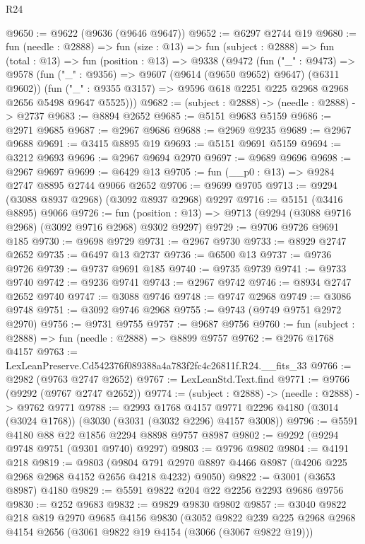 \begin{lexlean}{R24}
\begin{coremodule}
@9650 := @9622 (@9636 (@9646 @9647))
@9652 := @6297 @2744 @19
@9680 := fun (needle : @2888) =>
  fun (size : @13) =>
  fun (subject : @2888) =>
  fun (total : @13) =>
  fun (position : @13) =>
  @9338
    (@9472
      (fun ("_" : @9473) =>
      @9578
        (fun ("_" : @9356) => @9607 (@9614 (@9650 @9652) @9647) (@6311 @9602))
        (fun ("_" : @9355 @3157) => @9596 @618 @2251 @225 @2968 @2968 @2656 @5498 @9647 @5525)))
@9682 := (subject : @2888) -> (needle : @2888) -> @2737
@9683 := @8894 @2652
@9685 := @5151 @9683 @5159
@9686 := @2971 @9685
@9687 := @2967 @9686
@9688 := @2969 @9235
@9689 := @2967 @9688
@9691 := @3415 @8895 @19
@9693 := @5151 @9691 @5159
@9694 := @3212 @9693
@9696 := @2967 @9694 @2970
@9697 := @9689 @9696
@9698 := @2967 @9697
@9699 := @6429 @13
@9705 := fun (__p0 : @13) => @9284 @2747 @8895 @2744 @9066 @2652
@9706 := @9699 @9705
@9713 := @9294 (@3088 @8937 @2968) (@3092 @8937 @2968) @9297
@9716 := @5151 (@3416 @8895) @9066
@9726 := fun (position : @13) => @9713 (@9294 (@3088 @9716 @2968) (@3092 @9716 @2968) @9302 @9297)
@9729 := @9706 @9726 @9691 @185
@9730 := @9698 @9729
@9731 := @2967 @9730
@9733 := @8929 @2747 @2652
@9735 := @6497 @13 @2737
@9736 := @6500 @13
@9737 := @9736 @9726
@9739 := @9737 @9691 @185
@9740 := @9735 @9739
@9741 := @9733 @9740
@9742 := @9236 @9741
@9743 := @2967 @9742
@9746 := @8934 @2747 @2652 @9740
@9747 := @3088 @9746
@9748 := @9747 @2968
@9749 := @3086 @9748
@9751 := @3092 @9746 @2968
@9755 := @9743 (@9749 @9751 @2972 @2970)
@9756 := @9731 @9755
@9757 := @9687 @9756
@9760 := fun (subject : @2888) => fun (needle : @2888) => @8899 @9757
@9762 := @2976 @1768 @4157
@9763 := LexLeanPreserve.Cd542376f089388a4a783f2fc4c26811f.R24.__fits_33
@9766 := @2982 (@9763 @2747 @2652)
@9767 := LexLeanStd.Text.find
@9771 := @9766 (@9292 (@9767 @2747 @2652))
@9774 := (subject : @2888) -> (needle : @2888) -> @9762 @9771
@9788 := @2993
    @1768
    @4157
    @9771
    @2296
    @4180
    (@3014 (@3024 @1768))
    (@3030 (@3031 (@3032 @2296) @4157 @3008))
@9796 := @5591 @4180 @88 @22 @1856 @2294 @8898 @9757 @8987
@9802 := @9292 (@9294 @9748 @9751 (@9301 @9740) @9297)
@9803 := @9796 @9802
@9804 := @4191 @218
@9819 := @9803
    (@9804 @791 @2970 @8897 @4466 @8987 (@4206 @225 @2968 @2968 @4152 @2656 @4218 @4232) @9050)
@9822 := @3001 (@3653 @8987) @4180
@9829 := @5591 @9822 @204 @22 @2256 @2293 @9686 @9756
@9830 := @252 @9683
@9832 := @9829 @9830 @9802
@9857 := @3040
    @9822
    @218
    @819
    @2970
    @9685
    @4156
    @9830
    (@3052
      @9822
      @239
      @225
      @2968
      @2968
      @4154
      @2656
      (@3061 @9822 @19 @4154 (@3066 (@3067 @9822 @19)))

\end{coremodule}
\end{lexlean}
